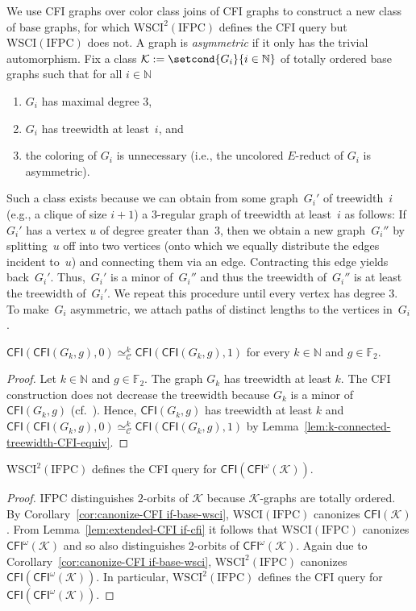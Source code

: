 \documentclass[]{lmcs}
\newcommand{\nat}{\mathbb{N}}
\newcommand{\FF}{\mathbb{F}}
\newcommand{\defining}[1]{\emph{#1}}
\newcommand{\vertA}{u}
\newcommand{\GraphClass}{\mathcal{K}}
\newcommand{\IFPC}{\ensuremath{\mathrm{IFPC}}}
\newcommand{\CFImsym}{\mathsf{CFI}^\omega}
\newcommand{\CFIm}[1]{\CFImsym(#1)}
\newcommand{\WSCIof}[1]{\mathrm{WSCI}(#1)}
\newcommand{\WSCIkof}[2]{\mathrm{WSCI}^{#1}(#2)}
\newcommand{\CFIsym}{\mathsf{CFI}}
\newcommand{\CFI}[1]{\CFIsym(#1)}
\newcommand{\kequiv}[1]{\simeq^#1_{\mathcal{C}}}
\begin{document}
We use CFI graphs over color class joins of CFI graphs
to construct a new class of base graphs,
for which $\WSCIkof{2}{\IFPC}$ defines the CFI query
but $\WSCIof{\IFPC}$ does not.
A graph is \defining{asymmetric} if it only has the trivial automorphism.
Fix a class $\GraphClass := \setcond{G_i}{i \in \nat}$ of totally ordered base graphs such that for all $i\in \nat$
\begin{enumerate}
	\item $G_i$ has maximal degree $3$,
	\item $G_i$ has treewidth at least~$i$, and
	\item the coloring of $G_i$ is unnecessary (i.e.,
the uncolored $E$-reduct of $G_i$ is asymmetric).
\end{enumerate} 
Such a class exists because we can obtain from some graph~$G_i'$ of treewidth~$i$
(e.g., a clique of size $i+1$)
a $3$-regular graph of treewidth at least~$i$ as follows:
If~$G_i'$ has a vertex $\vertA$ of degree greater than~$3$,
then we obtain a new graph~$G_i''$ by splitting~$\vertA$ off into two vertices
(onto which we equally distribute the edges incident to~$\vertA$)
and connecting them via an edge.
Contracting this edge yields back~$G_i'$.
Thus,~$G_i'$ is a minor of~$G_i''$ and thus the treewidth of~$G_i''$
is at least the treewidth of~$G_i'$.
We repeat this procedure until every vertex has degree $3$.
To make~$G_i$ asymmetric, we attach paths of distinct lengths to the vertices in~$G_i$.

\begin{lem}
	\label{lem:cfi-cfi-not-in-Ck}
	$\CFI{\CFI{G_k,g},0} \kequiv{k} \CFI{\CFI{G_k,g},1}$ for every $k \in \nat$ and $g \in \FF_2$.
\end{lem}
\begin{proof}
	Let $k \in \nat$ and $g \in \FF_2$.
	The graph $G_k$ has treewidth at least $k$.
	The CFI construction does not decrease the treewidth
	because $G_k$ is a minor of $\CFI{G_k, g}$ (cf.~\cite{DawarRicherby07}).
	Hence, $\CFI{G_k, g}$ has treewidth at least $k$ and 
	$\CFI{\CFI{G_k,g},0} \kequiv{k} \CFI{\CFI{G_k,g},1}$ by Lemma~\ref{lem:k-connected-treewidth-CFI-equiv}.
\end{proof}

\begin{lem}
	\label{lem:cfi-cfi-in-wsci-2}
	$\WSCIkof{2}{\IFPC}$ defines the CFI query for $\CFI{\CFIm{\GraphClass}}$.
\end{lem}
\begin{proof}
	\IFPC{} distinguishes $2$-orbits of $\GraphClass$
	because $\GraphClass$-graphs are totally ordered.
	By Corollary~\ref{cor:canonize-CFI if-base-wsci},
	$\WSCIof{\IFPC{}}$ canonizes $\CFI{\GraphClass}$.
	From Lemma~\ref{lem:extended-CFI if-cfi} it follows that $\WSCIof{\IFPC{}}$ canonizes $\CFIm{\GraphClass}$
	and so also distinguishes $2$-orbits of $\CFIm{\GraphClass}$.
	Again due to Corollary~\ref{cor:canonize-CFI if-base-wsci},
	$\WSCIkof{2}{\IFPC{}}$ canonizes $\CFI{\CFIm{\GraphClass}}$.
	In particular, $\WSCIkof{2}{\IFPC{}}$ defines the CFI query for $\CFI{\CFIm{\GraphClass}}$.
\end{proof}
\end{document}
